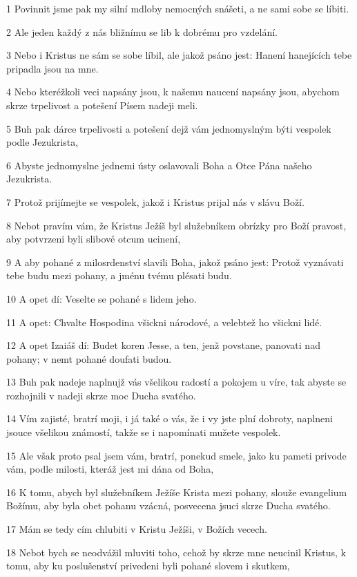 \par 1 Povinnit jsme pak my silní mdloby nemocných snášeti, a ne sami sobe se líbiti.
\par 2 Ale jeden každý z nás bližnímu se lib k dobrému pro vzdelání.
\par 3 Nebo i Kristus ne sám se sobe líbil, ale jakož psáno jest: Hanení hanejících tebe pripadla jsou na mne.
\par 4 Nebo kteréžkoli veci napsány jsou, k našemu naucení napsány jsou, abychom skrze trpelivost a potešení Písem nadeji meli.
\par 5 Buh pak dárce trpelivosti a potešení dejž vám jednomyslným býti vespolek podle Jezukrista,
\par 6 Abyste jednomyslne jednemi ústy oslavovali Boha a Otce Pána našeho Jezukrista.
\par 7 Protož prijímejte se vespolek, jakož i Kristus prijal nás v slávu Boží.
\par 8 Nebot pravím vám, že Kristus Ježíš byl služebníkem obrízky pro Boží pravost, aby potvrzeni byli slibové otcum ucinení,
\par 9 A aby pohané z milosrdenství slavili Boha, jakož psáno jest: Protož vyznávati tebe budu mezi pohany, a jménu tvému plésati budu.
\par 10 A opet dí: Veselte se pohané s lidem jeho.
\par 11 A opet: Chvalte Hospodina všickni národové, a velebtež ho všickni lidé.
\par 12 A opet Izaiáš dí: Budet koren Jesse, a ten, jenž povstane, panovati nad pohany; v nemt pohané doufati budou.
\par 13 Buh pak nadeje naplnujž vás všelikou radostí a pokojem u víre, tak abyste se rozhojnili v nadeji skrze moc Ducha svatého.
\par 14 Vím zajisté, bratrí moji, i já také o vás, že i vy jste plní dobroty, naplneni jsouce všelikou známostí, takže se i napomínati mužete vespolek.
\par 15 Ale však proto psal jsem vám, bratrí, ponekud smele, jako ku pameti privode vám, podle milosti, kteráž jest mi dána od Boha,
\par 16 K tomu, abych byl služebníkem Ježíše Krista mezi pohany, slouže evangelium Božímu, aby byla obet pohanu vzácná, posvecena jsuci skrze Ducha svatého.
\par 17 Mám se tedy cím chlubiti v Kristu Ježíši, v Božích vecech.
\par 18 Nebot bych se neodvážil mluviti toho, cehož by skrze mne neucinil Kristus, k tomu, aby ku poslušenství privedeni byli pohané slovem i skutkem,
